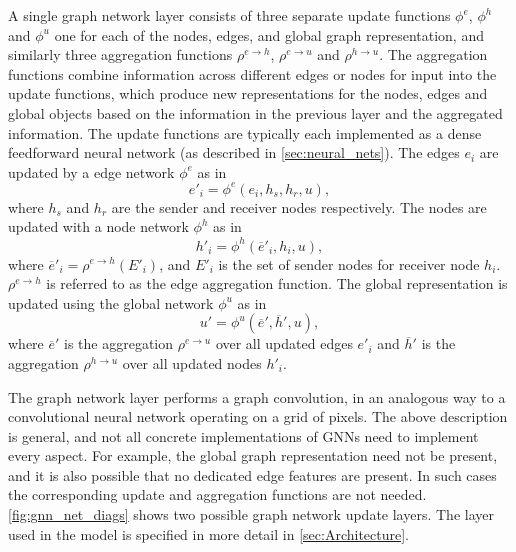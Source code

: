 A single graph network layer consists of three separate update functions $\phi^e$, $\phi^h$ and $\phi^u$ one for each of the nodes, edges, and global graph representation, and similarly three aggregation functions $\rho^{e \rightarrow h}$, $\rho^{e \rightarrow u}$ and $\rho^{h \rightarrow u}$.
The aggregation functions combine information across different edges or nodes for input into the update functions, which produce new representations for the nodes, edges and global objects based on the information in the previous layer and the aggregated information.
The update functions are typically each implemented as a dense feedforward neural network (as described in \cref{sec:neural_nets}).
The edges $e_i$ are updated by a edge network $\phi^e$ as in 
%
\begin{equation}
    e'_i = \phi^e (e_i, h_s, h_r, u) , 
\end{equation}
%
where $h_s$ and $h_r$ are the sender and receiver nodes respectively.
The nodes are updated with a node network $\phi^h$ as in
%
\begin{equation}
    h'_i = \phi^h (\overline{e}'_i, h_i, u) , 
\end{equation}
%
where $\overline{e}'_i = \rho^{e \rightarrow h}(E'_i)$, and $E'_i$ is the set of sender nodes for receiver node $h_i$.
$\rho^{e \rightarrow h}$ is referred to as the edge aggregation function.
The global representation is updated using the global network $\phi^u$ as in
%
\begin{equation}
    u' = \phi^u (\overline{e}', \overline{h}', u),
\end{equation}
%
where $\overline{e}'$ is the aggregation $\rho^{e \rightarrow u}$ over all updated edges $e'_i$ and $\overline{h}'$ is the aggregation $\rho^{h \rightarrow u}$ over all updated nodes $h'_i$.

The graph network layer performs a graph convolution, in an analogous way to a convolutional neural network operating on a grid of pixels.
The above description is general, and not all concrete implementations of GNNs need to implement every aspect.
For example, the global graph representation need not be present, and it is also possible that no dedicated edge features are present.
In such cases the corresponding update and aggregation functions are not needed.
\cref{fig:gnn_net_diags} shows two possible graph network update layers.
The layer used in the \GNN model is specified in more detail in \cref{sec:Architecture}.


